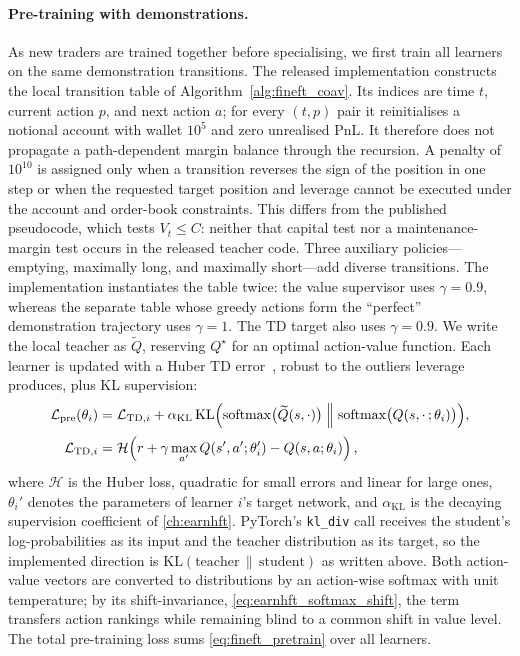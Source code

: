 \paragraph{Pre-training with demonstrations.} As new traders are trained together before specialising, we first train all learners on the same demonstration transitions. The released implementation constructs the local transition table of Algorithm~\ref{alg:fineft_coav}. Its indices are time $t$, current action $p$, and next action $a$; for every $(t,p)$ pair it reinitialises a notional account with wallet $10^5$ and zero unrealised PnL. It therefore does not propagate a path-dependent margin balance through the recursion. A penalty of $10^{10}$ is assigned only when a transition reverses the sign of the position in one step or when the requested target position and leverage cannot be executed under the account and order-book constraints. This differs from the published pseudocode, which tests $V_t\leq C$: neither that capital test nor a maintenance-margin test occurs in the released teacher code. Three auxiliary policies---emptying, maximally long, and maximally short---add diverse transitions. The implementation instantiates the table twice: the value supervisor uses $\gamma=0.9$, whereas the separate table whose greedy actions form the ``perfect'' demonstration trajectory uses $\gamma=1$. The TD target also uses $\gamma=0.9$. We write the local teacher as $\widetilde Q$, reserving $Q^\star$ for an optimal action-value function. Each learner is updated with a Huber TD error~\cite{huber1992robust}, robust to the outliers leverage produces, plus KL supervision:
\begin{equation}
\label{eq:fineft_pretrain}
\begin{aligned}
\mathcal{L}_{\mathrm{pre}}(\theta_i)
&= \mathcal{L}_{\mathrm{TD},i} + \alpha_{\mathrm{KL}}\,
\mathrm{KL}\Bigl(
  \mathrm{softmax}\bigl(\widetilde Q(s,\cdot)\bigr)
  \;\Big\|\;
  \mathrm{softmax}\bigl(Q(s,\cdot\,;\theta_i)\bigr)
\Bigr),\\[2pt]
\mathcal{L}_{\mathrm{TD},i}
&= \mathcal{H}\!\left(r + \gamma\max_{a'} Q(s',a';\theta_i') - Q(s,a;\theta_i)\right),
\end{aligned}
\end{equation}
where $\mathcal{H}$ is the Huber loss, quadratic for small errors and linear for large ones, $\theta_i'$ denotes the parameters of learner $i$'s target network, and $\alpha_{\mathrm{KL}}$ is the decaying supervision coefficient of \cref{ch:earnhft}. PyTorch's \texttt{kl\_div} call receives the student's log-probabilities as its input and the teacher distribution as its target, so the implemented direction is $\mathrm{KL}(\text{teacher}\,\|\,\text{student})$ as written above. Both action-value vectors are converted to distributions by an action-wise softmax with unit temperature; by its shift-invariance, \eqref{eq:earnhft_softmax_shift}, the term transfers action rankings while remaining blind to a common shift in value level. The total pre-training loss sums \eqref{eq:fineft_pretrain} over all learners.

